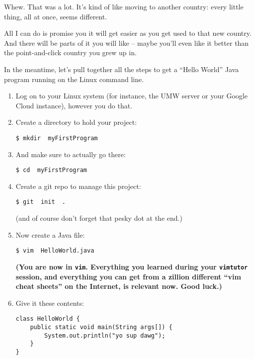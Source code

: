 Whew. That was a lot. It's kind of like moving to another country: every
little thing, all at once, seems different.

All I can do is promise you it will get easier as you get used to that new
country. And there will be parts of it you will like -- maybe you'll even like
it better than the point-and-click country you grew up in.

In the meantime, let's pull together all the steps to get a ``Hello World''
Java program running on the Linux command line.

\begin{enumerate}
\itemsep.1em
\item Log on to your Linux system (for instance, the UMW server or your Google
Cloud instance), however you do that.
\item Create a directory to hold your project:
\begin{Verbatim}[fontsize=\small]
$ mkdir  myFirstProgram
\end{Verbatim}

\item And make sure to actually go there:
\begin{Verbatim}[fontsize=\small]
$ cd  myFirstProgram
\end{Verbatim}

\item Create a git repo to manage this project:
\begin{Verbatim}[fontsize=\small]
$ git  init  .
\end{Verbatim}

(and of course don't forget that pesky dot at the end.)

\item Now create a Java file:
\begin{Verbatim}[fontsize=\small]
$ vim  HelloWorld.java
\end{Verbatim}

\textbf{(You are now in \texttt{vim}. Everything you learned during your
\texttt{vimtutor} session, and everything you can get from a zillion different
``vim cheat sheets'' on the Internet, is relevant now. Good luck.)}

\item Give it these contents:
\begin{samepage}
\begin{Verbatim}[fontsize=\small,frame=single]
class HelloWorld {
    public static void main(String args[]) {
        System.out.println("yo sup dawg");
    }
}
\end{Verbatim}
\end{samepage}


\end{enumerate}
